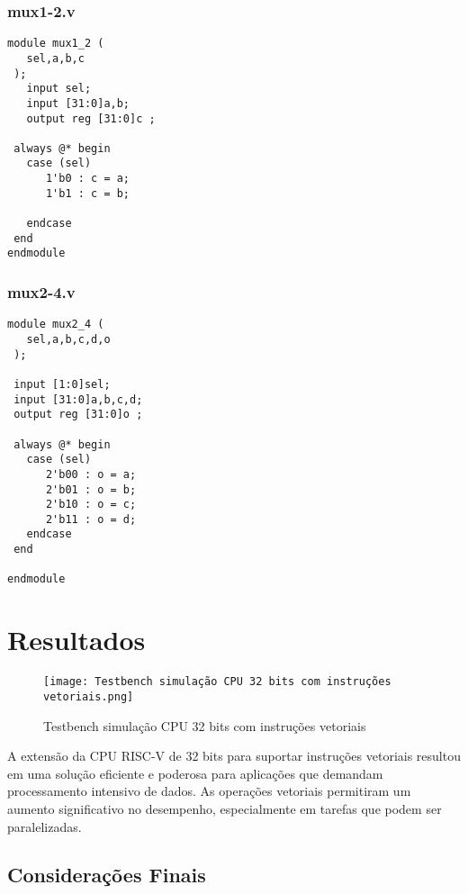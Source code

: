 \documentclass[12pt]{article}
\begin{document}
\subsubsection{mux1-2.v}
\begin{lstlisting}
module mux1_2 (
   sel,a,b,c
 );
   input sel;
   input [31:0]a,b;
   output reg [31:0]c ;

 always @* begin
   case (sel)
      1'b0 : c = a;
      1'b1 : c = b; 
      
   endcase
 end
endmodule
\end{lstlisting}

\subsubsection{mux2-4.v}
\begin{lstlisting}
module mux2_4 (
   sel,a,b,c,d,o
 );

 input [1:0]sel;
 input [31:0]a,b,c,d;
 output reg [31:0]o ;

 always @* begin
   case (sel)
      2'b00 : o = a;
      2'b01 : o = b;
      2'b10 : o = c;
      2'b11 : o = d; 
   endcase
 end
   
endmodule
\end{lstlisting}

\subsubsection{}



\section{Resultados}

\begin{figure}[h]
    \centering
    \texttt{[image: Testbench simulação CPU 32 bits com instruções vetoriais.png]}
    \caption{Testbench simulação CPU 32 bits com instruções vetoriais}
\end{figure}

A extensão da CPU RISC-V de 32 bits para suportar instruções vetoriais resultou em uma solução eficiente e poderosa para aplicações que demandam processamento intensivo de dados. As operações vetoriais permitiram um aumento significativo no desempenho, especialmente em tarefas que podem ser paralelizadas.

\subsection{Considerações Finais}
\end{document}
